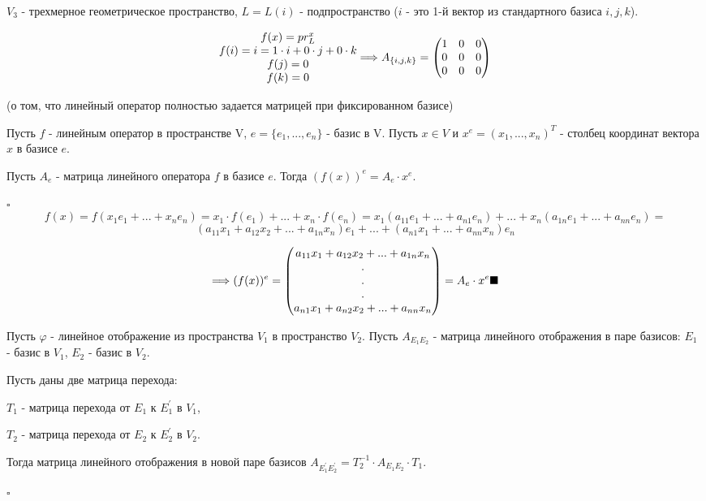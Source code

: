 \documentclass[../main.tex]{subfiles}
\begin{document}
\void{} $V_3$ - трехмерное геометрическое пространство, $L = L(i)$ - подпространство ($i$ - это 1-й вектор из стандартного базиса $i,j,k$).

$$
\begin{matrix}
    f(x) = pr_L^x\\
    f(i) = i = 1\cdot i + 0\cdot j + 0\cdot k\\
    f(j) = 0\\
    f(k) = 0
\end{matrix}
\Longrightarrow A_{\{i,j,k\}} =
\begin{pmatrix} 1&0&0\\0&0&0\\0&0&0\end{pmatrix}
$$

\void{} (о том, что линейный оператор полностью задается матрицей при фиксированном базисе)

Пусть $f$ - линейным оператор в пространстве V, $e = \{e_1,...,e_n\}$ - базис в V. Пусть $x\in V$ и
$x^e = (x_1,...,x_n)^T$ - столбец координат вектора $x$ в базисе $e$.

Пусть $A_e$ - матрица линейного оператора $f$ в базисе $e$. Тогда $(f(x))^e = A_e\cdot x^e$.

\void $\square$ 
$$
f(x) = f(x_1e_1 + ... + x_n e_n) = x_1\cdot f(e_1) + ... + x_n\cdot f(e_n) =
x_1(a_{11}e_1 + ... + a_{n1}e_n) + ... + x_n(a_{1n}e_1 + ... + a_{nn}e_n) =$$
$$
(a_{11}x_1 + a_{12}x_2 + ... + a_{1n}x_n)e_1 + ... + (a_{n1}x_1+...+a_{nn}x_n)e_n
$$

$$
\Longrightarrow (f(x))^e =
\begin{pmatrix} 
    a_{11}x_1 + a_{12}x_2 + ... + a_{1n}x_n\\
    .\\
    .\\
    .\\
    a_{n1}x_1 + a_{n2}x_2 + ... + a_{nn}x_n
\end{pmatrix} = A_e\cdot x^e \blacksquare
$$

\void{} Пусть $\varphi$ - линейное отображение из пространства $V_1$ в пространство $V_2$.
Пусть $A_{E_1E_2}$ - матрица линейного отображения в паре базисов: $E_1$ - базис в $V_1$, $E_2$ - базис в $V_2$.

Пусть даны две матрица перехода:

$T_1$ - матрица перехода от $E_1$ к $E_1^{'}$ в $V_1$,

$T_2$ - матрица перехода от $E_2$ к $E_2^{'}$ в $V_2$.

Тогда матрица линейного отображения в новой паре базисов $A_{E_1^{'}E_2^{'}} = T_2^{-1}\cdot A_{E_1E_2}\cdot T_1$.

\void
$\square$
\end{document}
